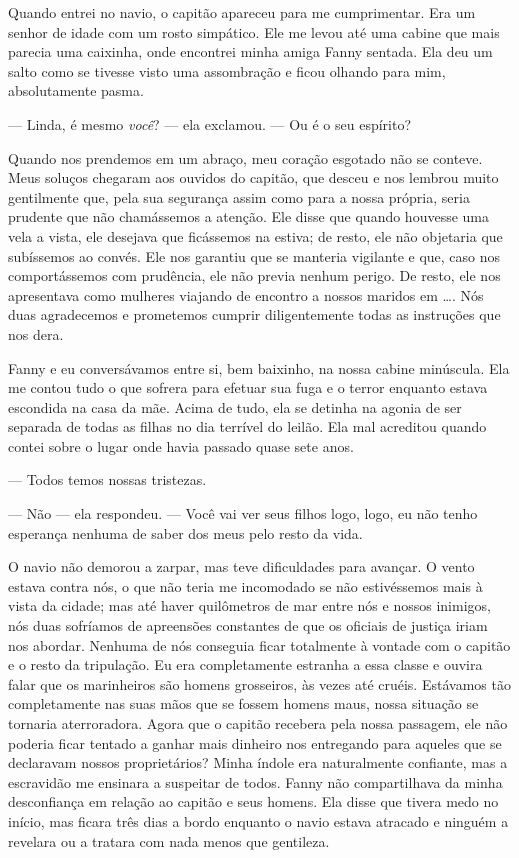 Quando entrei no navio, o capitão
apareceu para me cumprimentar. Era um senhor de idade com um rosto
simpático. Ele me levou até uma cabine que mais parecia uma caixinha,
onde encontrei minha amiga Fanny sentada. Ela deu um salto como se
tivesse visto uma assombração e ficou olhando para mim, absolutamente
pasma.

--- Linda, é mesmo \emph{você}? --- ela exclamou. --- Ou é o seu
espírito?

Quando nos prendemos em um abraço, meu coração esgotado não se conteve.
Meus soluços chegaram aos ouvidos do capitão, que desceu e nos lembrou
muito gentilmente que, pela sua segurança assim como para a nossa
própria, seria prudente que não chamássemos a atenção. Ele disse que
quando houvesse uma vela a vista, ele desejava que ficássemos na estiva;
de resto, ele não objetaria que subíssemos ao convés. Ele nos garantiu
que se manteria vigilante e que, caso nos comportássemos com prudência,
ele não previa nenhum perigo. De resto, ele nos apresentava como
mulheres viajando de encontro a nossos maridos em \ldots{}. Nós duas
agradecemos e prometemos cumprir diligentemente todas as instruções que
nos dera.

Fanny e eu conversávamos entre si, bem
baixinho, na nossa cabine minúscula. Ela me contou tudo o que sofrera
para efetuar sua fuga e o terror enquanto estava escondida na casa da
mãe. Acima de tudo, ela se detinha na agonia de ser separada de todas as
filhas no dia terrível do leilão. Ela mal acreditou quando contei sobre
o lugar onde havia passado quase sete anos.

--- Todos temos nossas tristezas.

--- Não --- ela respondeu. --- Você vai ver seus filhos logo, logo, eu
não tenho esperança nenhuma de saber dos meus pelo resto da vida.

O navio não demorou a zarpar, mas teve
dificuldades para avançar. O vento estava contra nós, o que não teria me
incomodado se não estivéssemos mais à vista da cidade; mas até haver
quilômetros de mar entre nós e nossos inimigos, nós duas sofríamos de
apreensões constantes de que os oficiais de justiça iriam nos abordar.
Nenhuma de nós conseguia ficar totalmente à vontade com o capitão e o
resto da tripulação. Eu era completamente estranha a essa classe e
ouvira falar que os marinheiros são homens grosseiros, às vezes até
cruéis. Estávamos tão completamente nas suas mãos que se fossem homens
maus, nossa situação se tornaria aterroradora. Agora que o capitão
recebera pela nossa passagem, ele não poderia ficar tentado a ganhar
mais dinheiro nos entregando para aqueles que se declaravam nossos
proprietários? Minha índole era naturalmente confiante, mas a escravidão
me ensinara a suspeitar de todos. Fanny não compartilhava da minha
desconfiança em relação ao capitão e seus homens. Ela disse que tivera
medo no início, mas ficara três dias a bordo enquanto o navio estava
atracado e ninguém a revelara ou a tratara com nada menos que gentileza.

